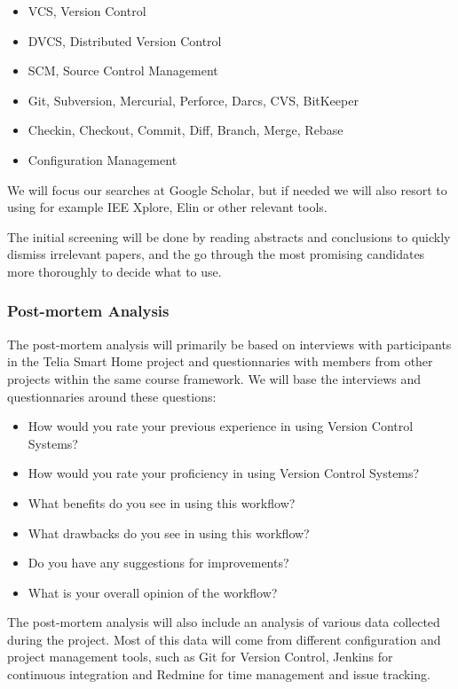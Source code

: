 \documentclass{article}
\begin{document}
\begin{itemize}
  \item VCS, Version Control
  \item DVCS, Distributed Version Control
  \item SCM, Source Control Management
  \item Git, Subversion, Mercurial, Perforce, Darcs, CVS, BitKeeper
  \item Checkin, Checkout, Commit, Diff, Branch, Merge, Rebase
  \item Configuration Management
\end{itemize}

We will focus our searches at Google Scholar, but if needed we will
also resort to using for example IEE Xplore, Elin or other relevant
tools.

The initial screening will be done by reading abstracts and
conclusions to quickly dismiss irrelevant papers, and the go through
the most promising candidates more thoroughly to decide what to use.

\subsubsection{Post-mortem Analysis}
The post-mortem analysis will primarily be based on interviews with
participants in the Telia Smart Home project and questionnaries with
members from other projects within the same course framework. We will
base the interviews and questionnaries around these questions:

\begin{itemize}
 \item How would you rate your previous experience in using Version Control 
       Systems?
 \item How would you rate your proficiency in using Version Control Systems?
 \item What benefits do you see in using this workflow?
 \item What drawbacks do you see in using this workflow?
 \item Do you have any suggestions for improvements?
 \item What is your overall opinion of the workflow?
\end{itemize}

The post-mortem analysis will also include an analysis of various data
collected during the project. Most of this data will come from
different configuration and project management tools, such as Git for
Version Control, Jenkins for continuous integration and Redmine for
time management and issue tracking.
\end{document}
